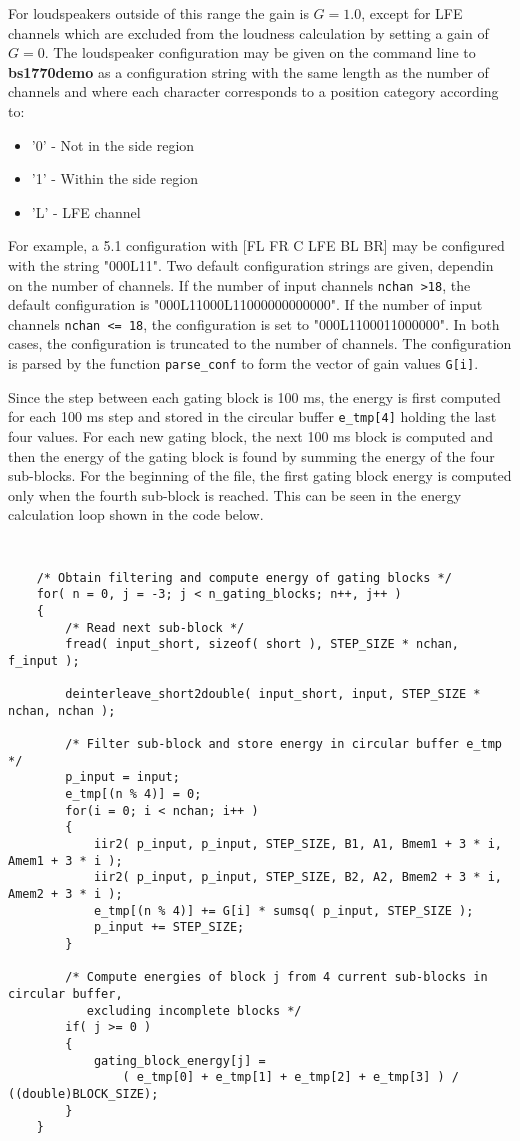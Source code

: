 For loudspeakers outside of this range the gain is $G=1.0$, except for LFE channels which are excluded
from the loudness calculation by setting a gain of $G=0$. The loudspeaker configuration may be given on
the command line to \textbf{bs1770demo} as a configuration string with the same length as the number of
channels and where each character corresponds to a position category according to:

\begin{itemize}
    \item '0' - Not in the side region
    \item '1' - Within the side region
    \item 'L' - LFE channel
\end{itemize}

For example, a 5.1 configuration with [FL FR C LFE BL BR] may be configured with the string "000L11".
Two default configuration strings are given, dependin on the number of channels. If the number of input
channels \texttt{nchan \textgreater 18}, the default configuration is "000L11000L11000000000000". If the 
number of input channels \texttt{nchan \textless = 18}, the configuration is set to "000L1100011000000". 
In both cases, the configuration is truncated to the number of channels. The configuration is parsed by
the function \texttt{parse\_conf} to form the vector of gain values \texttt{G[i]}.

Since the step between each gating block is 100 ms, the energy is first computed for each 100 ms
step and stored in the circular buffer \texttt{e\_tmp[4]} holding the last four values. For each
new gating block, the next 100 ms block is computed and then the energy of the gating block is found
by summing the energy of the four sub-blocks. For the beginning of the file, the first gating block
energy is computed only when the fourth sub-block is reached. This can be seen in the energy calculation
loop shown in the code below.

{\tt\small
\begin{verbatim}
    /* Obtain filtering and compute energy of gating blocks */
    for( n = 0, j = -3; j < n_gating_blocks; n++, j++ )
    {
        /* Read next sub-block */
        fread( input_short, sizeof( short ), STEP_SIZE * nchan, f_input );

        deinterleave_short2double( input_short, input, STEP_SIZE * nchan, nchan );

        /* Filter sub-block and store energy in circular buffer e_tmp */
        p_input = input;
        e_tmp[(n % 4)] = 0;
        for(i = 0; i < nchan; i++ )
        {
            iir2( p_input, p_input, STEP_SIZE, B1, A1, Bmem1 + 3 * i, Amem1 + 3 * i );
            iir2( p_input, p_input, STEP_SIZE, B2, A2, Bmem2 + 3 * i, Amem2 + 3 * i );
            e_tmp[(n % 4)] += G[i] * sumsq( p_input, STEP_SIZE );
            p_input += STEP_SIZE;
        }

        /* Compute energies of block j from 4 current sub-blocks in circular buffer, 
           excluding incomplete blocks */
        if( j >= 0 )
        {
            gating_block_energy[j] = 
                ( e_tmp[0] + e_tmp[1] + e_tmp[2] + e_tmp[3] ) / ((double)BLOCK_SIZE);
        }
    }
\end{verbatim}
}

